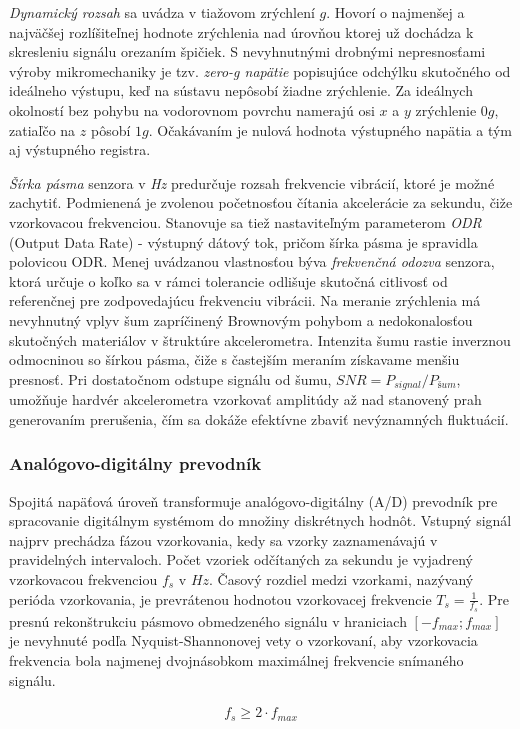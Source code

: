 \emph{Dynamický rozsah} sa uvádza v tiažovom  zrýchlení $g$. Hovorí o najmenšej a najväčšej rozlíšiteľnej hodnote zrýchlenia nad
úrovňou ktorej už dochádza k skresleniu signálu orezaním špičiek. S nevyhnutnými drobnými nepresnosťami výroby mikromechaniky je tzv.
\emph{zero-g napätie} popisujúce odchýlku skutočného od ideálneho výstupu, keď na sústavu nepôsobí žiadne zrýchlenie. Za ideálnych
okolností bez pohybu na vodorovnom povrchu namerajú osi $x$ a $y$ zrýchlenie $0g$, zatiaľčo na $z$ pôsobí $1g$. Očakávaním je nulová
hodnota výstupného napätia a tým aj výstupného registra.

\emph{Šírka pásma} senzora v \emph{Hz} predurčuje rozsah frekvencie vibrácií, ktoré je možné zachytiť. Podmienená je zvolenou
početnosťou  čítania akcelerácie za sekundu, čiže vzorkovacou frekvenciou. Stanovuje sa tiež nastaviteľným parameterom \emph{ODR}
(Output Data Rate) - výstupný dátový tok, pričom šírka pásma je spravidla polovicou ODR. Menej uvádzanou vlastnosťou býva
\emph{frekvenčná odozva} senzora, ktorá určuje o koľko sa v rámci tolerancie odlišuje skutočná citlivosť od referenčnej pre
zodpovedajúcu frekvenciu vibrácii. Na meranie zrýchlenia má nevyhnutný vplyv šum zapríčinený Brownovým pohybom a nedokonalosťou
skutočných materiálov v štruktúre akcelerometra. Intenzita šumu rastie inverznou odmocninou so šírkou pásma, čiže s častejším meraním
získavame menšiu presnosť. Pri dostatočnom odstupe signálu od šumu, $SNR = P_{signal} / P_{šum}$, umožňuje hardvér akcelerometra
vzorkovať amplitúdy až nad stanovený prah generovaním prerušenia, čím sa dokáže efektívne zbaviť nevýznamných fluktuácií.

\subsubsection{Analógovo-digitálny prevodník}
Spojitá napäťová úroveň transformuje analógovo-digitálny (A/D) prevodník pre spracovanie digitálnym systémom do množiny diskrétnych
hodnôt. Vstupný signál najprv prechádza fázou vzorkovania, kedy sa vzorky zaznamenávajú v pravidelných intervaloch. Počet vzoriek
odčítaných za sekundu je vyjadrený vzorkovacou frekvenciou $f_s$ v $Hz$. Časový rozdiel medzi vzorkami, nazývaný perióda vzorkovania,
je prevrátenou hodnotou vzorkovacej frekvencie $T_s = \frac{1}{f_s}$. Pre presnú rekonštrukciu pásmovo obmedzeného signálu v hraniciach
$[-f_{max}; f_{max}]$ je nevyhnuté podľa Nyquist-Shannonovej vety o vzorkovaní, aby vzorkovacia frekvencia bola najmenej dvojnásobkom
maximálnej frekvencie snímaného signálu.
\begin{ceqn}\begin{align}
   f_s \geq 2 \cdot f_{max}
\end{align}\end{ceqn}

